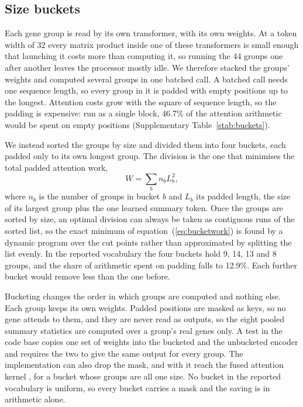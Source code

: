 \subsection{Size buckets}
\label{smeth:buckets}

Each gene group is read by its own transformer, with its own weights. At a
token width of 32 every matrix product inside one of these transformers is
small enough that launching it costs more than computing it, so running the
44 groups one after another leaves the processor mostly idle. We therefore
stacked the groups' weights and computed several groups in one batched
call. A batched call needs one sequence length, so every group in it is
padded with empty positions up to the longest. Attention costs grow with
the square of sequence length, so the padding is expensive: run as a single
block, 46.7\% of the attention arithmetic would be spent on empty positions
(Supplementary Table~\ref{stab:buckets}).

We instead sorted the groups by size and divided them into four buckets,
each padded only to its own longest group. The division is the one that
minimises the total padded attention work,
\begin{equation}
W = \sum_{b} n_b L_b^{2},
\label{eq:bucketwork}
\end{equation}
where $n_b$ is the number of groups in bucket $b$ and $L_b$ its padded
length, the size of its largest group plus the one learned summary token.
Once the groups are sorted by size, an optimal division can always be taken
as contiguous runs of the sorted list, so the exact minimum of
equation~(\ref{eq:bucketwork}) is found by a dynamic program over the cut
points rather than approximated by splitting the list evenly. In the
reported vocabulary the four buckets hold 9, 14, 13 and 8 groups, and the
share of arithmetic spent on padding falls to 12.9\%. Each further bucket
would remove less than the one before.

Bucketing changes the order in which groups are computed and nothing else.
Each group keeps its own weights. Padded positions are masked as keys, so
no gene attends to them, and they are never read as outputs, so the eight
pooled summary statistics are computed over a group's real genes only. A
test in the code base copies one set of weights into the bucketed and the
unbucketed encoder and requires the two to give the same output for every
group. The implementation can also drop the mask, and with it reach the
fused attention kernel \citep{dao2022flashattention}, for a bucket whose groups are all one size. No
bucket in the reported vocabulary is uniform, so every bucket carries a
mask and the saving is in arithmetic alone.

